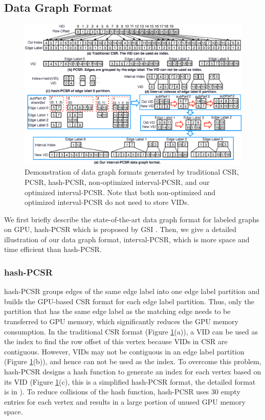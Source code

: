 \subsection{Data Graph Format}
\begin{figure}
\centering
\includegraphics[width=\textwidth]{./figure/graphformat.eps}
\caption{Demonstration of data graph formats generated by traditional CSR, PCSR, hash-PCSR, non-optimized interval-PCSR, and our optimized interval-PCSR. Note that both non-optimized and optimized interval-PCSR do not need to store VIDs.}	
\label{fig:dataformat}
\end{figure}

We first briefly describe the state-of-the-art data graph format for labeled graphs on GPU, hash-PCSR which is proposed by GSI \cite{zeng2020gsi}. Then, we give a detailed illustration of our data graph format, interval-PCSR, which is more space and time efficient than hash-PCSR.
\subsubsection{hash-PCSR}
hash-PCSR groups edges of the same edge label into one edge label partition and builds the GPU-based CSR format for each edge label partition. Thus, only the partition that has the same edge label as the matching edge needs to be transferred to GPU memory, which significantly reduces the GPU memory consumption. In the traditional CSR format (Figure \ref{fig:dataformat}(a)), a VID can be used as the index to find the row offset of this vertex because VIDs in CSR are contiguous. However, VIDs may not be contiguous in an edge label partition (Figure \ref{fig:dataformat}(b)), and hence can not be used as the index. To overcome this problem, hash-PCSR designs a hash function to generate an index for each vertex based on its VID (Figure \ref{fig:dataformat}(c), this is a simplified hash-PCSR format, the detailed format is in \cite{zeng2020gsi}). To reduce collisions of the hash function, hash-PCSR uses 30 empty entries for each vertex and results in a large portion of unused GPU memory space.
